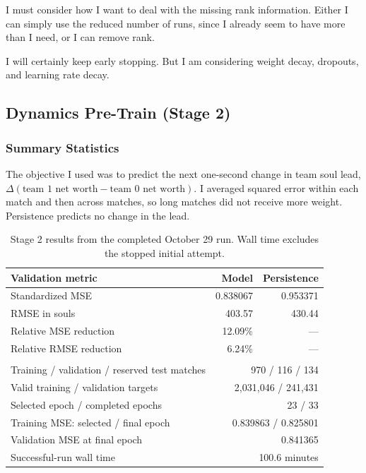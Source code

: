 \documentclass[11pt]{article}
\begin{document}
    I must consider how I want to deal with the missing rank information. Either I can simply use the reduced number of runs, 
    since I already seem to have more than I need, or I can remove rank.

    I will certainly keep early stopping. But I am considering weight decay, dropouts, and learning rate decay.


\subsection{Dynamics Pre-Train (Stage 2)}
\subsubsection{Summary Statistics}
    The objective I used was to predict the next one-second change in team soul lead, $\Delta(\text{team 1 net worth}-\text{team 0 net worth})$.
    I averaged squared error within each match and then across matches, so long matches did not receive more weight. 
    Persistence predicts no change in the lead.

    \begin{table}[H]
    \centering
    \small
    \renewcommand{\arraystretch}{1.15}
    \begin{tabularx}{\textwidth}{>{\raggedright\arraybackslash}X r r}
    \toprule
    \textbf{Validation metric} & \textbf{Model} & \textbf{Persistence} \\
    \midrule
    Standardized MSE & 0.838067 & 0.953371 \\
    RMSE in souls & 403.57 & 430.44 \\
    Relative MSE reduction & 12.09\% & --- \\
    Relative RMSE reduction & 6.24\% & --- \\
    \midrule
    \multicolumn{3}{l}{\textbf{Run statistics}} \\
    Training / validation / reserved test matches & \multicolumn{2}{r}{970 / 116 / 134} \\
    Valid training / validation targets & \multicolumn{2}{r}{2,031,046 / 241,431} \\
    Selected epoch / completed epochs & \multicolumn{2}{r}{23 / 33} \\
    Training MSE: selected / final epoch & \multicolumn{2}{r}{0.839863 / 0.825801} \\
    Validation MSE at final epoch & \multicolumn{2}{r}{0.841365} \\
    Successful-run wall time & \multicolumn{2}{r}{100.6 minutes} \\
    \bottomrule
    \end{tabularx}
    \caption{Stage 2 results from the completed October 29 run. Wall time excludes
    the stopped initial attempt.}
    \label{tab:dynamics-results}
    \end{table}
\end{document}
